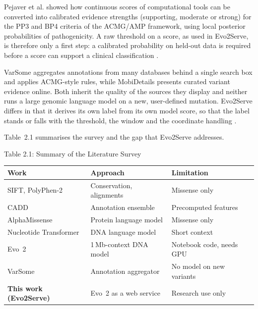 Pejaver et al. showed how continuous scores of computational tools can be converted into calibrated evidence strengths (supporting, moderate or strong) for the PP3 and BP4 criteria of the ACMG/AMP framework, using local posterior probabilities of pathogenicity. A raw threshold on a score, as used in Evo2Serve, is therefore only a first step: a calibrated probability on held-out data is required before a score can support a clinical classification \cite{pejaver2022svi}.

VarSome aggregates annotations from many databases behind a single search box and applies ACMG-style rules, while MobiDetails presents curated variant evidence online. Both inherit the quality of the sources they display and neither runs a large genomic language model on a new, user-defined mutation. Evo2Serve differs in that it derives its own label from its own model score, so that the label stands or falls with the threshold, the window and the coordinate handling \cite{vandenbroucke2019varsome,baux2021mobidetails}.

Table~2.1 summarises the survey and the gap that Evo2Serve addresses.

\begin{table}[H]\centering
\fontsize{11}{13}\selectfont\renewcommand{\baselinestretch}{1}\selectfont
\renewcommand{\arraystretch}{1.3}
\label{tab:2.1}
Table 2.1: Summary of the Literature Survey\par\vspace{4pt}
\begin{tabular}{|p{140pt}|p{150pt}|p{150pt}|}
\hline
\textbf{Work} & \textbf{Approach} & \textbf{Limitation} \\
\hline
SIFT, PolyPhen-2 \cite{ng2001sift,adzhubei2010polyphen2} & Conservation, alignments & Missense only \\
\hline
CADD \cite{rentzsch2019cadd} & Annotation ensemble & Precomputed features \\
\hline
AlphaMissense \cite{cheng2023alphamissense} & Protein language model & Missense only \\
\hline
Nucleotide Transformer \cite{dallatorre2024nt} & DNA language model & Short context \\
\hline
Evo~2 \cite{brixi2026evo2} & 1\,Mb-context DNA model & Notebook code, needs GPU \\
\hline
VarSome \cite{vandenbroucke2019varsome} & Annotation aggregator & No model on new variants \\
\hline
\textbf{This work (Evo2Serve)} & Evo~2 as a web service & Research use only \\
\hline
\end{tabular}
\end{table}

